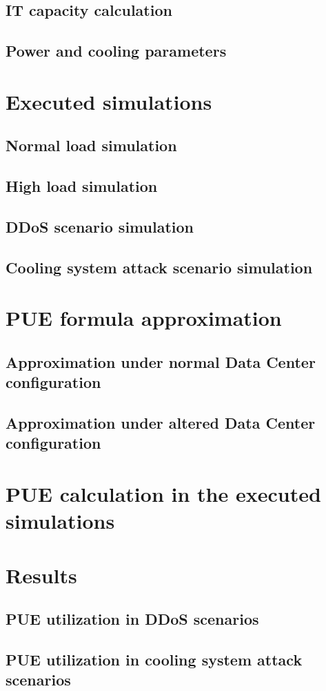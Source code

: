 \subsection{IT capacity calculation}

\subsection{Power and cooling parameters}


\section{Executed simulations}

\subsection{Normal load simulation}

\subsection{High load simulation}

\subsection{DDoS scenario simulation}

\subsection{Cooling system attack scenario simulation}

\section{PUE formula approximation}

\subsection{Approximation under normal Data Center configuration}

\subsection{Approximation under altered Data Center configuration}

\section{PUE calculation in the executed simulations}\label{section:puecalculation_tool}

\section{Results}

\subsection{PUE utilization in DDoS scenarios}

\subsection{PUE utilization in cooling system attack scenarios}


